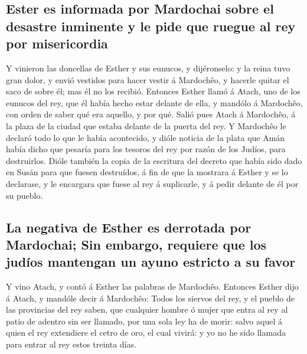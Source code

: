 \hypertarget{ester-es-informada-por-mardochai-sobre-el-desastre-inminente-y-le-pide-que-ruegue-al-rey-por-misericordia}{%
\subsection{Ester es informada por Mardochai sobre el desastre inminente
y le pide que ruegue al rey por
misericordia}\label{ester-es-informada-por-mardochai-sobre-el-desastre-inminente-y-le-pide-que-ruegue-al-rey-por-misericordia}}

 Y vinieron las doncellas de Esther y sus eunucos, y
dijéronselo: y la reina tuvo gran dolor, y envió vestidos para hacer
vestir á Mardochêo, y hacerle quitar el saco de sobre él; mas él no los
recibió.  Entonces Esther llamó á Atach, uno de los
eunucos del rey, que él había hecho estar delante de ella, y mandólo á
Mardochêo, con orden de saber qué era aquello, y por qué. 
Salió pues Atach á Mardochêo, á la plaza de la ciudad que estaba delante
de la puerta del rey.  Y Mardochêo le declaró todo lo que
le había acontecido, y dióle noticia de la plata que Amán había dicho
que pesaría para los tesoros del rey por razón de los Judíos, para
destruirlos.  Dióle también la copia de la escritura del
decreto que había sido dado en Susán para que fuesen destruídos, á fin
de que la mostrara á Esther y se lo declarase, y le encargara que fuese
al rey á suplicarle, y á pedir delante de él por su pueblo.

\hypertarget{la-negativa-de-esther-es-derrotada-por-mardochai-sin-embargo-requiere-que-los-juduxedos-mantengan-un-ayuno-estricto-a-su-favor}{%
\subsection{La negativa de Esther es derrotada por Mardochai; Sin
embargo, requiere que los judíos mantengan un ayuno estricto a su
favor}\label{la-negativa-de-esther-es-derrotada-por-mardochai-sin-embargo-requiere-que-los-juduxedos-mantengan-un-ayuno-estricto-a-su-favor}}

 Y vino Atach, y contó á Esther las palabras de Mardochêo.
 Entonces Esther dijo á Atach, y mandóle decir á
Mardochêo:  Todos los siervos del rey, y el pueblo de las
provincias del rey saben, que cualquier hombre ó mujer que entra al rey
al patio de adentro sin ser llamado, por una sola ley ha de morir: salvo
aquel á quien el rey extendiere el cetro de oro, el cual vivirá: y yo no
he sido llamada para entrar al rey estos treinta días.

